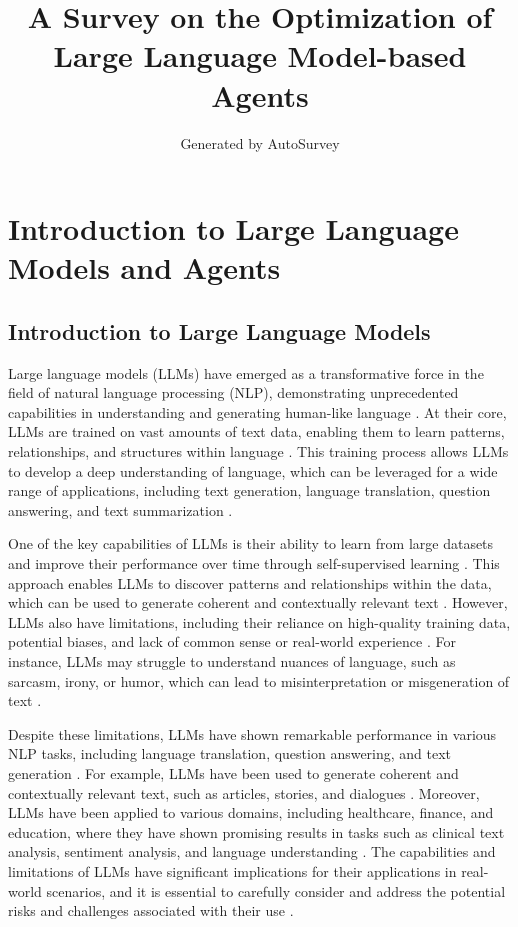 \documentclass[11pt]{article}
\title{A Survey on the Optimization of Large Language Model-based Agents}
\author{Generated by AutoSurvey}
\date{}
\begin{document}
\maketitle
\tableofcontents
\newpage

\section{Introduction to Large Language Models and Agents}

\subsection{Introduction to Large Language Models}

Large language models (LLMs) have emerged as a transformative force in the field of natural language processing (NLP), demonstrating unprecedented capabilities in understanding and generating human-like language \cite{ref1}. At their core, LLMs are trained on vast amounts of text data, enabling them to learn patterns, relationships, and structures within language \cite{ref2}. This training process allows LLMs to develop a deep understanding of language, which can be leveraged for a wide range of applications, including text generation, language translation, question answering, and text summarization \cite{ref3}.

One of the key capabilities of LLMs is their ability to learn from large datasets and improve their performance over time through self-supervised learning \cite{ref4}. This approach enables LLMs to discover patterns and relationships within the data, which can be used to generate coherent and contextually relevant text \cite{ref5}. However, LLMs also have limitations, including their reliance on high-quality training data, potential biases, and lack of common sense or real-world experience \cite{ref6}. For instance, LLMs may struggle to understand nuances of language, such as sarcasm, irony, or humor, which can lead to misinterpretation or misgeneration of text \cite{ref7}.

Despite these limitations, LLMs have shown remarkable performance in various NLP tasks, including language translation, question answering, and text generation \cite{ref8}. For example, LLMs have been used to generate coherent and contextually relevant text, such as articles, stories, and dialogues \cite{ref9}. Moreover, LLMs have been applied to various domains, including healthcare, finance, and education, where they have shown promising results in tasks such as clinical text analysis, sentiment analysis, and language understanding \cite{ref3}. The capabilities and limitations of LLMs have significant implications for their applications in real-world scenarios, and it is essential to carefully consider and address the potential risks and challenges associated with their use \cite{ref10}.
\end{document}
